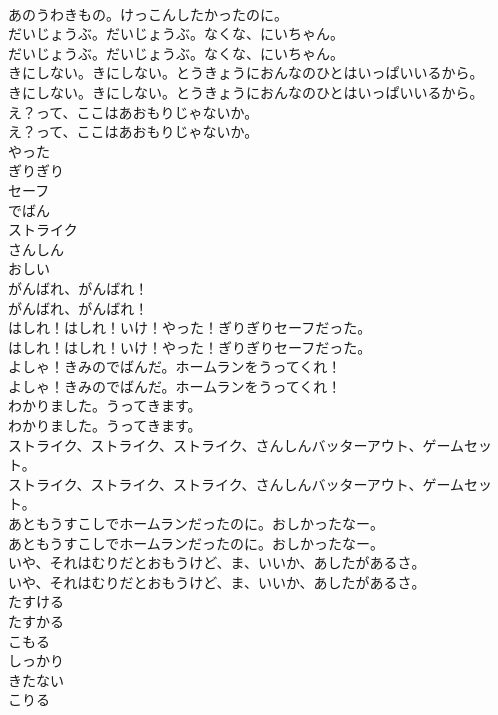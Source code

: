 \documentclass[8pt]{extreport}
\begin{document}
\begin{CJK}{UTF8}{min}
\\	あのうわきもの。けっこんしたかったのに。 
\\	だいじょうぶ。だいじょうぶ。なくな、にいちゃん。	
\\	だいじょうぶ。だいじょうぶ。なくな、にいちゃん。 
\\	きにしない。きにしない。とうきょうにおんなのひとはいっぱいいるから。	
\\	きにしない。きにしない。とうきょうにおんなのひとはいっぱいいるから。 
\\	え？って、ここはあおもりじゃないか。	
\\	え？って、ここはあおもりじゃないか。 
\\	やった
\\	ぎりぎり
\\	セーフ
\\	でばん
\\	ストライク
\\	さんしん
\\	おしい
\\	がんばれ、がんばれ！	
\\	がんばれ、がんばれ！ 
\\	はしれ！はしれ！いけ！やった！ぎりぎりセーフだった。	
\\	はしれ！はしれ！いけ！やった！ぎりぎりセーフだった。 
\\	よしゃ！きみのでばんだ。ホームランをうってくれ！	
\\	よしゃ！きみのでばんだ。ホームランをうってくれ！ 
\\	わかりました。うってきます。	
\\	わかりました。うってきます。 
\\	ストライク、ストライク、ストライク、さんしんバッターアウト、ゲームセット。	
\\	ストライク、ストライク、ストライク、さんしんバッターアウト、ゲームセット。 
\\	あともうすこしでホームランだったのに。おしかったなー。	
\\	あともうすこしでホームランだったのに。おしかったなー。 
\\	いや、それはむりだとおもうけど、ま、いいか、あしたがあるさ。	
\\	いや、それはむりだとおもうけど、ま、いいか、あしたがあるさ。 
\\	たすける
\\	たすかる
\\	こもる
\\	しっかり
\\	きたない
\\	こりる

\end{CJK}
\end{document}
